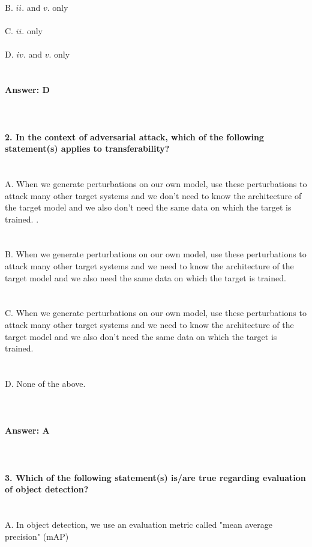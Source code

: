 \documentclass[prl,twocolumn,showpacs,preprintnumbers,superscriptaddress]{revtex4}
\theoremstyle{plain}
\theoremstyle{definition}
\begin{document}
\begin{widetext}
B. $ii.$ and $v.$ only
\\
\\
C. $ii.$ only
\\
\\
D. $iv.$ and $v.$ only
\\
\\
\\
\textbf{Answer: D}
\\
\\
\\
\\
\textbf{2. In the context of adversarial attack, which of the following statement(s) applies to transferability?}
\\
\\
\\
A. When we generate perturbations on our own model, use these perturbations to attack many other target systems and we don’t need to know the architecture of the target model and we also don’t need the same data on which the target is trained.
.
\\
\\
\\
B. When we generate perturbations on our own model, use these perturbations to attack many other target systems and we need to know the architecture of the target model and we also need the same data on which the target is trained.
\\
\\
\\
C. When we generate perturbations on our own model, use these perturbations to attack many other target systems and we need to know the architecture of the target model and we also don’t need the same data on which the target is trained.
\\
\\
\\
D. None of the above.
\\
\\
\\
\\
\textbf{Answer: A}
\\
\\
\\
\\
\textbf{3. Which of the following statement(s) is/are true regarding evaluation of object detection?}
\\
\\
\\
A. In object detection, we use an evaluation metric called "mean average precision" (mAP) 

\end{widetext}
\end{document}
